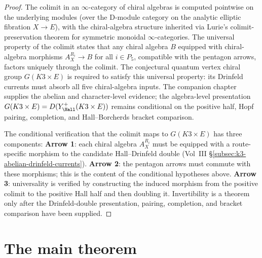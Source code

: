 \begin{proof}
The colimit in an $\infty$-category of chiral algebras is computed pointwise on the underlying modules (over
the D-module category on the analytic elliptic fibration $X \to E$), with the chiral-algebra structure
inherited via Lurie's colimit-preservation theorem for symmetric monoidal $\infty$-categories. The
universal property of the colimit states that any chiral algebra $B$ equipped with chiral-algebra morphisms
$A_X^{R_i} \to B$ for all $i \in P_5$, compatible with the pentagon arrows, factors uniquely through the
colimit. The conjectural quantum vertex chiral group $G(K3 \times E)$ is required to satisfy this universal
property: its Drinfeld currents must absorb all five chiral-algebra inputs. The companion chapter supplies the
abelian and character-level evidence; the algebra-level presentation
$G(K3 \times E)=D(Y^+_{\Hall}(K3\times E))$ remains conditional on the
positive half, Hopf pairing, completion, and Hall--Borcherds bracket comparison.

The conditional verification that the colimit maps to \(G(K3 \times E)\) has three components:
\textbf{Arrow 1}: each chiral algebra \(A_X^{R_i}\) must be equipped with a route-specific morphism to the
candidate Hall--Drinfeld double (Vol~III \S\ref{subsec:k3-abelian-drinfeld-currents}). \textbf{Arrow 2}: the
pentagon arrows must commute with these morphisms; this is the content of the conditional hypotheses above.
\textbf{Arrow 3}: universality is verified by constructing the induced morphism from the positive colimit to
the positive Hall half and then doubling it. Invertibility is a theorem only after the Drinfeld-double
presentation, pairing, completion, and bracket comparison have been supplied.
\end{proof}

\section{The main theorem}
\label{sec:cy-c-gl-main-theorem}

